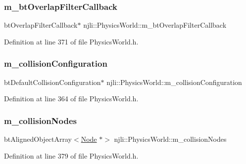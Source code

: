 \subsubsection{\texorpdfstring{m\+\_\+bt\+Overlap\+Filter\+Callback}{m\_btOverlapFilterCallback}}
{\footnotesize\ttfamily bt\+Overlap\+Filter\+Callback$\ast$ njli\+::\+Physics\+World\+::m\+\_\+bt\+Overlap\+Filter\+Callback\hspace{0.3cm}{\ttfamily [private]}}



Definition at line 371 of file Physics\+World.\+h.

\mbox{\label{classnjli_1_1_physics_world_aafdda2fa604a317def17d80f314ffa4c}} 
\subsubsection{\texorpdfstring{m\+\_\+collision\+Configuration}{m\_collisionConfiguration}}
{\footnotesize\ttfamily bt\+Default\+Collision\+Configuration$\ast$ njli\+::\+Physics\+World\+::m\+\_\+collision\+Configuration\hspace{0.3cm}{\ttfamily [private]}}



Definition at line 364 of file Physics\+World.\+h.

\mbox{\label{classnjli_1_1_physics_world_a8f68c492c26e09fa5dcc538c5c63b587}} 
\subsubsection{\texorpdfstring{m\+\_\+collision\+Nodes}{m\_collisionNodes}}
{\footnotesize\ttfamily bt\+Aligned\+Object\+Array$<$\mbox{\hyperlink{classnjli_1_1_node}{Node}} $\ast$$>$ njli\+::\+Physics\+World\+::m\+\_\+collision\+Nodes\hspace{0.3cm}{\ttfamily [private]}}



Definition at line 379 of file Physics\+World.\+h.

